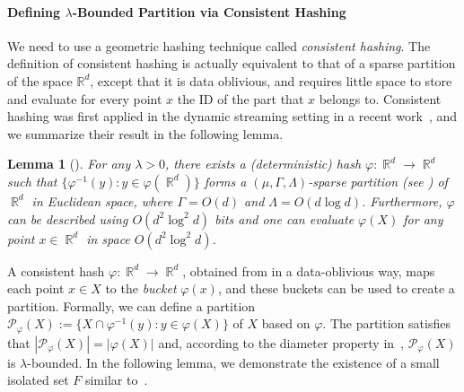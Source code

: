 \documentclass[letterpaper,11pt]{article}
\theoremstyle{plain}
\newtheorem{lemma}[theorem]{Lemma}
\theoremstyle{definition}
\theoremstyle{remark}
\DeclareMathOperator{\R}{\mathbb{R}}
\renewcommand{\phi}{\varphi}
\newcommand{\calP}{\mathcal{P}}
\begin{document}
\paragraph{Defining $\lambda$-Bounded Partition via Consistent Hashing} 
We need to use a geometric hashing technique called \emph{consistent hashing}.
The definition of consistent hashing is actually equivalent to that of a sparse partition of the space $\mathbb{R}^d$,
except that it is data oblivious, and requires little space to store and evaluate for every point $x$ the ID of the part that $x$ belongs to. 
Consistent hashing was first applied in the dynamic streaming setting in a recent work~\cite{arxiv.2204.02095}, and we summarize their result in the following lemma.

\begin{lemma}[{\cite[Theorem 5.1]{arxiv.2204.02095}}]
    \label{lem:consistent hashing}
    For any $\lambda > 0$, there exists a (deterministic) hash $\phi :\R^d\to\R^d$ such that $\{\phi^{-1}(y):y\in \phi(\R^d)\}$ forms a $(\mu,\Gamma,\Lambda)$-sparse partition (see ) of $\R^d$ in Euclidean space, where $\Gamma= O(d)$ and $\Lambda = O(d\log d)$.
Furthermore, $\phi$ can be described using $O(d^2\log^2d)$ bits and one can evaluate $\phi(X)$ for any point $x\in\R^d$ in space $O(d^2\log^2d)$.
\end{lemma}
A consistent hash $\phi:\R^d\to\R^d$, obtained from  in a data-oblivious way, maps each point $x\in X$ to the \emph{bucket} $\phi(x)$, and these buckets can be used to create a partition. Formally, we can define a partition $\calP_{\phi}(X):=\{X\cap \phi^{-1}(y):y\in \phi(X) \}$ of $X$ based on $\phi$. The partition satisfies that $|\calP_{\phi}(X)|=|\phi(X) |$ and,
according to the diameter property in~, $\calP_{\phi}(X)$ is $\lambda$-bounded.
In the following lemma, we demonstrate the existence of a small isolated set $F$ similar to~.
\end{document}
